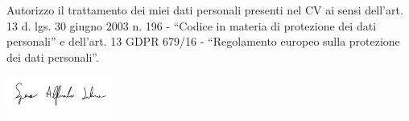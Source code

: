 \documentclass[9pt]{developercv} %
\begin{document}


\vfill
\footnotesize{Autorizzo il trattamento dei miei dati personali presenti nel CV ai sensi dell'art. 13 d. lgs. 30 giugno 2003 n. 196 - “Codice in materia di protezione
dei dati personali” e dell'art. 13 GDPR 679/16 - “Regolamento europeo sulla protezione dei dati personali”.}

\begin{flushright}
	\includegraphics[width=3.5cm]{images/firma.png}
\end{flushright}
\end{document}
